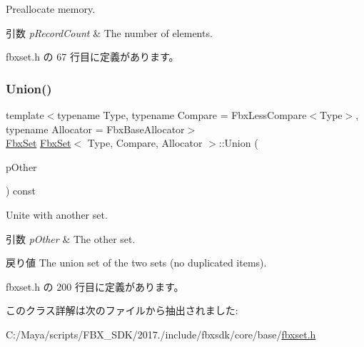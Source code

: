 Preallocate memory. 
\begin{DoxyParams}{引数}
{\em p\+Record\+Count} & The number of elements. \\
\hline
\end{DoxyParams}


 fbxset.\+h の 67 行目に定義があります。

\mbox{\label{class_fbx_set_a2a1a03dffe4d1b40a04bd48e4b6b3c10}} 
\subsubsection{\texorpdfstring{Union()}{Union()}}
{\footnotesize\ttfamily template$<$typename Type, typename Compare = Fbx\+Less\+Compare$<$\+Type$>$, typename Allocator = Fbx\+Base\+Allocator$>$ \\
\hyperlink{class_fbx_set}{Fbx\+Set} \hyperlink{class_fbx_set}{Fbx\+Set}$<$ Type, Compare, Allocator $>$\+::Union (\begin{DoxyParamCaption}\item[{const \hyperlink{class_fbx_set}{Fbx\+Set}$<$ Type, Compare, Allocator $>$ \&}]{p\+Other }\end{DoxyParamCaption}) const\hspace{0.3cm}{\ttfamily [inline]}}

Unite with another set. 
\begin{DoxyParams}{引数}
{\em p\+Other} & The other set. \\
\hline
\end{DoxyParams}
\begin{DoxyReturn}{戻り値}
The union set of the two sets (no duplicated items). 
\end{DoxyReturn}


 fbxset.\+h の 200 行目に定義があります。



このクラス詳解は次のファイルから抽出されました\+:\begin{DoxyCompactItemize}
\item 
C\+:/\+Maya/scripts/\+F\+B\+X\+\_\+\+S\+D\+K/2017./include/fbxsdk/core/base/\hyperlink{fbxset_8h}{fbxset.\+h}\end{DoxyCompactItemize}
